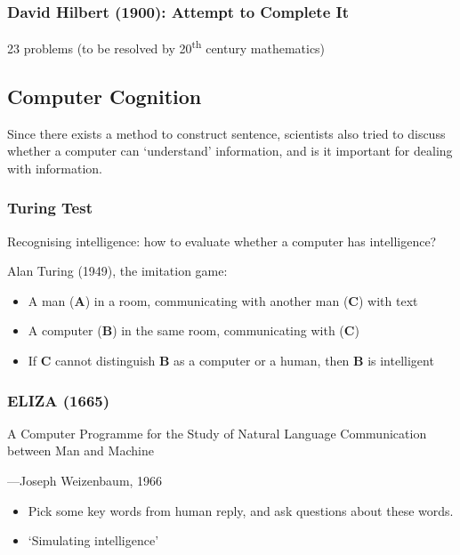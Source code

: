\documentclass[a4paper, openany]{book}
\begin{document}
\subsubsection{David Hilbert (1900): Attempt to Complete It}

23 problems (to be resolved by 20\textsuperscript{th} century mathematics)

\subsection{Computer Cognition}

Since there exists a method to construct sentence, scientists also tried to discuss whether a computer can `understand' information, and is it important for dealing with information.

\subsubsection{Turing Test}

Recognising intelligence: how to evaluate whether a computer has intelligence?

Alan Turing (1949), the imitation game:

\begin{itemize}
  \item A man (\textbf{A}) in a room, communicating with another man (\textbf{C}) with text
  \item A computer (\textbf{B}) in the same room, communicating with (\textbf{C})
  \item If \textbf{C} cannot distinguish \textbf{B} as a computer or a human, then \textbf{B} is intelligent
\end{itemize}

\subsubsection{ELIZA (1665)}

A Computer Programme for the Study of Natural Language Communication between Man and Machine

\begin{flushright}
  ---Joseph Weizenbaum, 1966
\end{flushright}

\begin{itemize}
  \item Pick some key words from human reply, and ask questions about these words.
  \item `Simulating intelligence'
\end{itemize}
\end{document}
